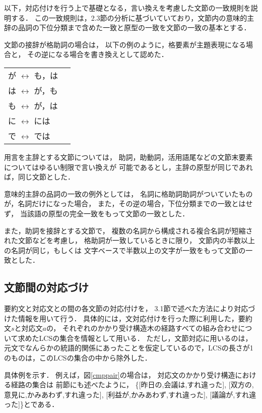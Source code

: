 以下，対応付けを行う上で基礎となる，言い換えを考慮した文節の一致規則を説明する．
この一致規則は，2.3節の分析に基づいていており，文節内の意味的主辞の品詞の下位分類まで含めた一致と原型の一致を文節の一致の基本とする．

文節の接辞が格助詞の場合は，
以下の例のように，格要素が主題表現になる場合と，
その逆になる場合を書き換えとして認めた．

\begin{center}
\small
\begin{tabular}{lp{}}
が $\leftrightarrow$ も，は\\
は $\leftrightarrow$ が，も\\
も $\leftrightarrow$ が，は\\
に $\leftrightarrow$ には　\\
で $\leftrightarrow$ では
\end{tabular}
\end{center}

用言を主辞とする文節については，
助詞，助動詞，活用語尾などの文節末要素についてはゆるい制限で言い換えが
可能であるとし，主辞の原型が同じであれば，同じ文節とした．

意味的主辞の品詞の一致の例外としては，
名詞に格助詞助詞がついていたものが，名詞だけになった場合，
また，その逆の場合，下位分類までの一致とはせず，
当該語の原型の完全一致をもって文節の一致とした．

また，助詞を接辞とする文節で，
複数の名詞から構成される複合名詞が短縮された文節などを考慮し，
格助詞が一致しているときに限り，
文節内の半数以上の名詞が同じ，もしくは
文字ベースで半数以上の文字が一致をもって文節の一致とした．

\subsection{文節間の対応づけ}

要約文と対応文との間の各文節の対応付けを，
3.1節で述べた方法により対応づけた情報を用いて行う．
具体的には，文対応付けを行った際に利用した，要約文$s$と対応文$a$の，
それぞれのかかり受け構造木の経路すべての組み合わせについて求めたLCSの集合を情報として用いる．
ただし，文節対応に用いるのは，元文でなんらかの統語的関係にあったことを仮定しているので，LCSの長さが1のものは，このLCSの集合の中から除外した．

具体例を示す．
例えば，図\ref{cmppair}の場合は，
対応文のかかり受け構造における経路の集合は
前節にも述べたように，
\{[昨日の,会議は,すれ違った],
[双方の,意見に,かみあわず,すれ違った],
[利益が,かみあわず,すれ違った],
[議論が,すれ違った]\}とである．

